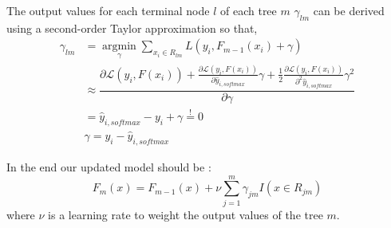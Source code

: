 \documentclass[12pt,a4paper,onecolumn,oneside,draft=on]{article}
\begin{document}
The output values for each terminal node $l$ of each tree $m$ $\gamma_{l m}$ can be derived using a second-order Taylor approximation so that,
\begin{equation}
\begin{aligned}
\gamma_{lm} &= \underset{\gamma}{\operatorname{argmin}} \sum_{x_{i} \in R_{lm}} L\left(y_{i}, F_{m-1}\left(x_{i}\right)+\gamma\right) \\ 
&\approx \dfrac{\partial \mathcal{L}\left(y_{i}, F\left(x_{i}\right)\right) +  \frac{\partial \mathcal{L}\left(y_{i}, F\left(x_{i}\right)\right)}{\partial\hat{y}_{i,softmax}}\gamma + \frac{1}{2}\frac{\partial \mathcal{L}\left(y_{i}, F\left(x_{i}\right)\right)}{\partial^2\hat{y}_{i,softmax}}\gamma^2}{\partial \gamma} \\
&=  \hat{y}_{i,softmax} - y_i +   \gamma \stackrel{!}{=} 0 \\
&\gamma= y_i  -\hat{y}_{i,softmax}  
\end{aligned}
\end{equation}


In the end our updated model should be :
\begin{equation}
F_{m}(x)=F_{m-1}(x)+\nu \sum_{j=1}^{m} \gamma_{j m} I\left(x \in R_{j m}\right)
\end{equation} where $\nu$ is a learning rate to weight the output values of the tree $m$. 
\end{document}
